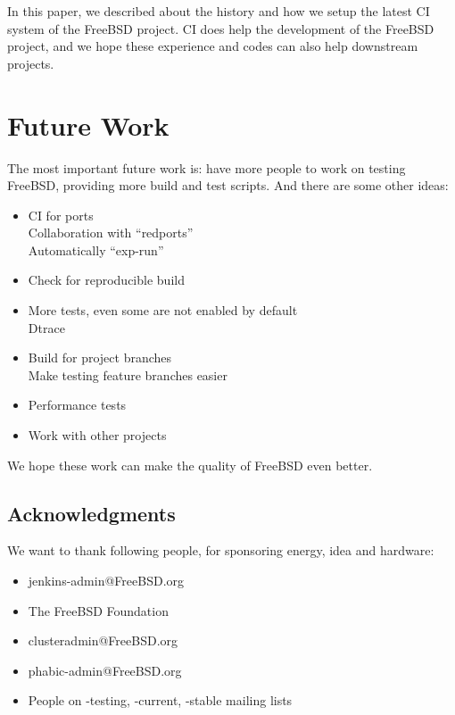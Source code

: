 \documentclass[a4paper,twocolumn,10pt]{article}
\begin{document}
In this paper, we described about the history and how we setup the latest CI
system of the FreeBSD project.  CI does help the development of the FreeBSD
project, and we hope these experience and codes can also help downstream
projects.

\section{Future Work}

The most important future work is: have more people to work on testing FreeBSD,
providing more build and test scripts. And there are some other ideas:

\begin{itemize}
\item CI for ports\\
  Collaboration with ``redports''\\
  Automatically ``exp-run''
\item Check for reproducible build
\item More tests, even some are not enabled by default\\
Dtrace
\item Build for project branches\\
Make testing feature branches easier
\item Performance tests
\item Work with other projects
\end{itemize}

We hope these work can make the quality of FreeBSD even better.

\subsection*{Acknowledgments}

We want to thank following people, for sponsoring energy, idea and hardware:

\begin{itemize}
\item jenkins-admin@FreeBSD.org
\item The FreeBSD Foundation
\item clusteradmin@FreeBSD.org
\item phabic-admin@FreeBSD.org
\item People on -testing, -current, -stable mailing lists
\end{itemize}
\end{document}
